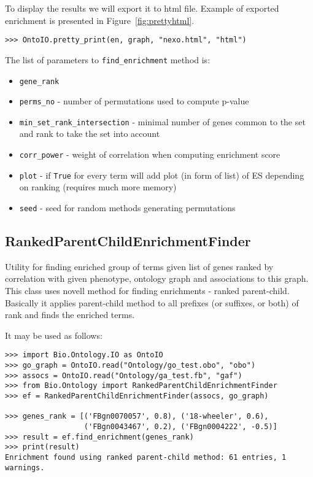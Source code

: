 To display the results we will export it to html file. Example of exported
enrichment is presented in Figure~\ref{fig:prettyhtml}.
\begin{verbatim}
>>> OntoIO.pretty_print(en, graph, "nexo.html", "html")
\end{verbatim}

The list of parameters to \verb|find_enrichment| method is:
\begin{itemize}
\item \verb|gene_rank| 
\item \verb|perms_no| - number of permutations used to compute p-value
\item \verb|min_set_rank_intersection| - minimal number of genes common
to the set and rank to take the set into account
\item \verb|corr_power| - weight of correlation when computing
enrichment score
\item \verb|plot| - if \verb|True| for every term will add plot (in form of list) 
		of ES depending on ranking (requires much more memory)
\item \verb|seed| - seed for random methods generating permutations
\end{itemize}

\subsection{RankedParentChildEnrichmentFinder}
Utility for finding enriched group of terms given list of genes ranked
by correlation with given phenotype, ontology graph and associations to this graph.
This class uses novell method for finding enrichments -
ranked parent-child. Basically it applies parent-child method
to all prefixes (or suffixes, or both) of rank and finds the
enriched terms.

It may be used as follows:
\begin{verbatim}
>>> import Bio.Ontology.IO as OntoIO
>>> go_graph = OntoIO.read("Ontology/go_test.obo", "obo")
>>> assocs = OntoIO.read("Ontology/ga_test.fb", "gaf")
>>> from Bio.Ontology import RankedParentChildEnrichmentFinder
>>> ef = RankedParentChildEnrichmentFinder(assocs, go_graph)

>>> genes_rank = [('FBgn0070057', 0.8), ('18-wheeler', 0.6),
                  ('FBgn0043467', 0.2), ('FBgn0004222', -0.5)]
>>> result = ef.find_enrichment(genes_rank)
>>> print(result)
Enrichment found using ranked parent-child method: 61 entries, 1 warnings.
\end{verbatim}

